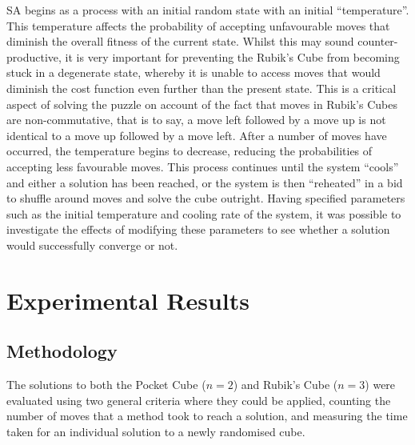 \documentclass[UKenglish]{svproc}
\begin{document}
SA begins as a process with an initial random state with an initial ``temperature''. This temperature affects the probability of accepting unfavourable moves that diminish the overall fitness of the current state. Whilst this may sound counter-productive, it is very important for preventing the Rubik's Cube from becoming stuck in a degenerate state, whereby it is unable to access moves that would diminish the cost function even further than the present state. This is a critical aspect of solving the puzzle on account of the fact that moves in Rubik's Cubes are non-commutative, that is to say, a move left followed by a move up is not identical to a move up followed by a move left. After a number of moves have occurred, the temperature begins to decrease, reducing the probabilities of accepting less favourable moves. This process continues until the system ``cools'' and either a solution has been reached, or the system is then ``reheated'' in a bid to shuffle around moves and solve the cube outright. Having specified parameters such as the initial temperature and cooling rate of the system, it was possible to investigate the effects of modifying these parameters to see whether a solution would successfully converge or not.



\section{Experimental Results}

\subsection{Methodology}
The solutions to both the Pocket Cube ($n=2$) and Rubik's Cube ($n=3$) were evaluated using two general criteria where they could be applied, counting the number of moves that a method took to reach a solution, and measuring the time taken for an individual solution to a newly randomised cube.
\end{document}
